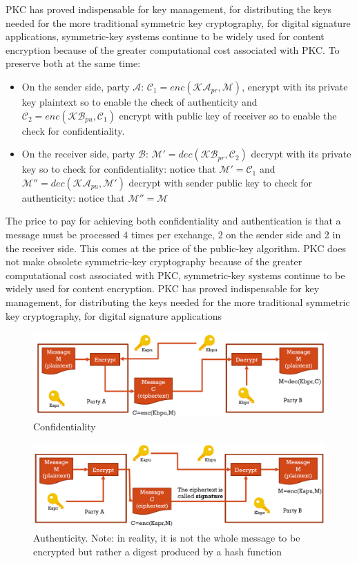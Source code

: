 PKC has proved indispensable for key management, for distributing the keys needed for the more traditional symmetric key cryptography, for digital signature applications, symmetric-key systems continue to be widely used for content encryption because of the greater computational cost associated with PKC. To preserve both at the same time:
\begin{itemize}
	\item On the sender side, party $\mathcal{A}$: $\mathcal{C}_1=enc(\mathcal{KA}_{pr},\mathcal{M})$, encrypt with its private key plaintext so to enable the check of authenticity and $\mathcal{C}_2=enc(\mathcal{KB}_{pu},\mathcal{C}_1)$ encrypt with public key of receiver so to enable the check for confidentiality.
	\item On the receiver side, party $\mathcal{B}$: $\mathcal{M}\prime = dec(\mathcal{KB}_{pr}, \mathcal{C}_2)$ decrypt with its private key so to check for confidentiality: notice that $\mathcal{M'} =\mathcal{C}_1$ and $\mathcal{M''} = dec(\mathcal{KA}_{pu},\mathcal{M'})$ decrypt with sender public key to check for authenticity: notice that $\mathcal{M''} =\mathcal{M}$
\end{itemize}
The price to pay for achieving both confidentiality and authentication is that a message must be processed 4 times per exchange, 2 on the sender side and 2 in the receiver side. This comes at the price of the public-key algorithm.
PKC does not make obsolete symmetric-key cryptography because of the greater computational cost associated with PKC, symmetric-key systems continue to be widely used for content encryption.
PKC has proved indispensable for key management, for distributing the keys needed for the more traditional symmetric key cryptography, for digital signature applications


\begin{figure}
	\centering
	\includegraphics[width=0.7\linewidth]{Images/Chapter5/confidentiality}
	\caption{Confidentiality}
	\label{fig:confidentiality}
\end{figure}

\begin{figure}
	\centering
	\includegraphics[width=0.7\linewidth]{Images/Chapter5/authenticity}
	\caption{Authenticity. Note: in reality, it is not the whole message to be encrypted but rather a digest produced by a hash function}
	\label{fig:authenticity}
\end{figure}

